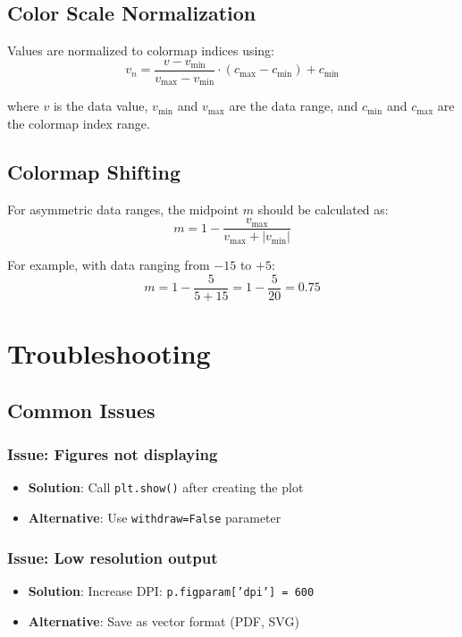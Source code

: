 \documentclass[11pt,a4paper]{article}
\begin{document}
\subsection{Color Scale Normalization}

Values are normalized to colormap indices using:
\begin{equation}
v_n = \frac{v - v_{\min}}{v_{\max} - v_{\min}} \cdot (c_{\max} - c_{\min}) + c_{\min}
\end{equation}

where $v$ is the data value, $v_{\min}$ and $v_{\max}$ are the data range, and $c_{\min}$ and $c_{\max}$ are the colormap index range.

\subsection{Colormap Shifting}

For asymmetric data ranges, the midpoint $m$ should be calculated as:
\begin{equation}
m = 1 - \frac{v_{\max}}{v_{\max} + |v_{\min}|}
\end{equation}

For example, with data ranging from $-15$ to $+5$:
\begin{equation}
m = 1 - \frac{5}{5 + 15} = 1 - \frac{5}{20} = 0.75
\end{equation}

\section{Troubleshooting}

\subsection{Common Issues}

\subsubsection{Issue: Figures not displaying}
\begin{itemize}[leftmargin=*]
    \item \textbf{Solution}: Call \texttt{plt.show()} after creating the plot
    \item \textbf{Alternative}: Use \texttt{withdraw=False} parameter
\end{itemize}

\subsubsection{Issue: Low resolution output}
\begin{itemize}[leftmargin=*]
    \item \textbf{Solution}: Increase DPI: \texttt{p.figparam['dpi'] = 600}
    \item \textbf{Alternative}: Save as vector format (PDF, SVG)
\end{itemize}
\end{document}
